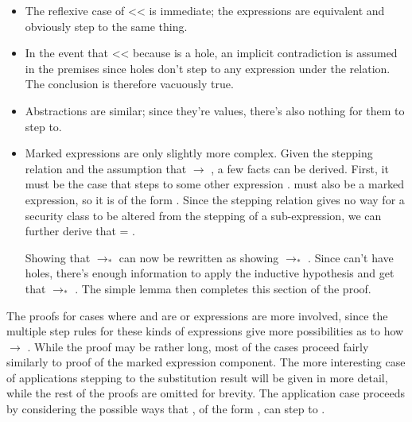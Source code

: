 \documentclass[12pt]{report}
\begin{document}
\begin{itemize}

\item  The reflexive case of  <<  is
    immediate; the expressions are equivalent and obviously step to
        the same thing.



\item  In the event that  <<  because
     is a hole, an implicit contradiction is assumed in
        the premises since holes don't step to any expression under
        the  relation. The conclusion is therefore
        vacuously true.



\item  Abstractions are similar; since they're values, there's also
    nothing for them to step to.



\item  Marked expressions are only slightly more complex. Given the
    stepping relation and the assumption that 
          $\to$ , a few
        facts can be derived. First, it must be the case that
         steps to some other expression
        .  must also be a marked
        expression, so it is of the form 
         . Since the stepping
        relation gives no way for a security class to be altered from
        the stepping of a sub-expression, we can further derive that
         = .


      Showing that  $\to_*$  can now be
        rewritten as showing  
         $\to_*$  
        . Since  can't have holes,
        there's enough information to apply the inductive hypothesis
        and get that  $\to_*$ . The
        simple lemma  then
        completes this section of the proof.

\end{itemize}


The proofs for cases where  and  are
 or  expressions are more involved,
since the multiple step rules for these kinds of expressions give
more possibilities as to how  $\to$ . While
the proof may be rather long, most of the cases proceed fairly
similarly to proof of the marked expression component. The more
interesting case of applications stepping to the substitution result
will be given in more detail, while the rest of the proofs are
omitted for brevity. The application case proceeds by considering the
possible ways that , of the form 
 , can step to .
\end{document}

